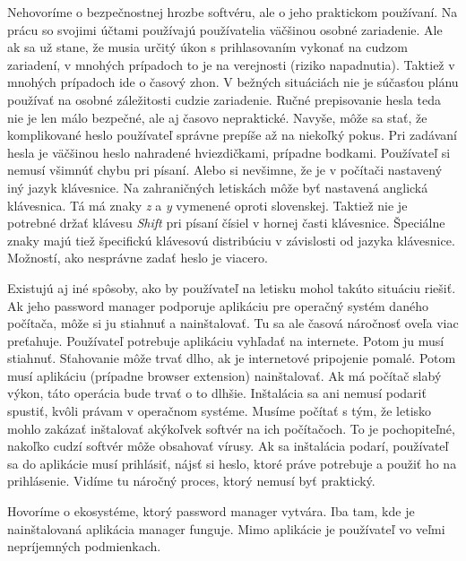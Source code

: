 Nehovoríme o bezpečnostnej hrozbe softvéru, ale o jeho praktickom používaní. Na prácu so svojimi účtami používajú používatelia väčšinou osobné zariadenie. Ale ak sa už stane, že musia určitý úkon s prihlasovaním vykonať na cudzom zariadení, v mnohých prípadoch to je na verejnosti (riziko napadnutia). Taktiež v mnohých prípadoch ide o časový zhon. V bežných situáciách nie je súčasťou plánu používať na osobné záležitosti cudzie zariadenie. Ručné prepisovanie hesla teda nie je len málo bezpečné, ale aj časovo nepraktické. Navyše, môže sa stať, že komplikované heslo používateľ správne prepíše až na niekoľký pokus. Pri zadávaní hesla je väčšinou heslo nahradené hviezdičkami, prípadne bodkami. Používateľ si nemusí všimnúť chybu pri písaní. Alebo si nevšimne, že je v počítači nastavený iný jazyk klávesnice. Na zahraničných letiskách môže byť nastavená anglická klávesnica. Tá má znaky \textit{z} a \textit{y} vymenené oproti slovenskej. Taktiež nie je potrebné držať klávesu \textit{Shift} pri písaní čísiel v hornej časti klávesnice. Špeciálne znaky majú tiež špecifickú klávesovú distribúciu v závislosti od jazyka klávesnice. Možností, ako nesprávne zadať heslo je viacero. 

Existujú aj iné spôsoby, ako by používateľ na letisku mohol takúto situáciu riešiť. Ak jeho password manager podporuje aplikáciu pre operačný systém daného počítača, môže si ju stiahnuť a nainštalovať. Tu sa ale časová náročnosť oveľa viac preťahuje. Používateľ potrebuje aplikáciu vyhľadať na internete. Potom ju musí stiahnuť. Sťahovanie môže trvať dlho, ak je internetové pripojenie pomalé. Potom musí aplikáciu (prípadne browser extension) nainštalovať. Ak má počítač slabý výkon, táto operácia bude trvať o to dlhšie. Inštalácia sa ani nemusí podariť spustiť, kvôli právam v operačnom systéme. Musíme počítať s tým, že letisko mohlo zakázať inštalovať akýkoľvek softvér na ich počítačoch. To je pochopiteľné, nakoľko cudzí softvér môže obsahovať vírusy. Ak sa inštalácia podarí, používateľ sa do aplikácie musí prihlásiť, nájsť si heslo, ktoré práve potrebuje a použiť ho na prihlásenie. Vidíme tu náročný proces, ktorý nemusí byť praktický. 

Hovoríme o ekosystéme, ktorý password manager vytvára. Iba tam, kde je nainštalovaná aplikácia manager funguje. Mimo aplikácie je používateľ vo veľmi nepríjemných podmienkach. 